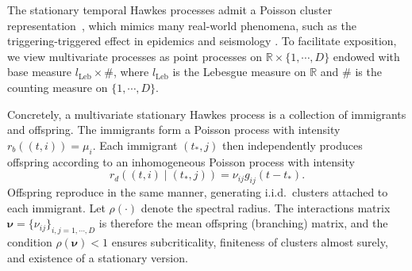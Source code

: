 \documentclass[11pt]{article}
\numberwithin{equation}{section}
\theoremstyle{plain}
\theoremstyle{definition}
\theoremstyle{definition}
\theoremstyle{assumption}
\theoremstyle{proposition}
\theoremstyle{proposition}
\theoremstyle{example}
\theoremstyle{lemma}
\theoremstyle{theorem}
\theoremstyle{remark}
\begin{document}
The stationary temporal Hawkes processes admit a Poisson cluster representation~\cite[Example 8.3(c)]{Daley_and_Vere-Jones2003}, which mimics many real-world phenomena, such as the triggering-triggered effect in epidemics and seismology \citep{reinhart2018review}. To facilitate exposition, we view multivariate processes as point processes on $\mathbb{R}\times\{1,\cdots,D\}$ endowed with base measure $l_{\mathrm{Leb}}\times\#$, where $l_{\mathrm{Leb}}$ is the Lebesgue measure on $\mathbb{R}$ and $\#$ is the counting measure on $\{1,\cdots,D\}$. 

Concretely, a multivariate stationary Hawkes process is a collection of immigrants and offspring. The immigrants form a Poisson process with intensity $r_b((t,i))=\mu_i$. Each immigrant $(t_\ast,j)$ then independently produces offspring according to an inhomogeneous Poisson process with intensity
\[
r_d((t,i)\mid (t_\ast,j))=\nu_{ij}g_{ij}(t-t_\ast).
\]
Offspring reproduce in the same manner, generating i.i.d.\ clusters attached to each immigrant. Let $\rho(\cdot)$ denote the spectral radius. The interactions matrix $\boldsymbol{\nu}=\{\nu_{ij}\}_{i,j=1,\cdots,D}$ is therefore the mean offspring (branching) matrix, and the condition $\rho(\boldsymbol{\nu})<1$ ensures subcriticality, finiteness of clusters almost surely, and existence of a stationary version.
\end{document}
